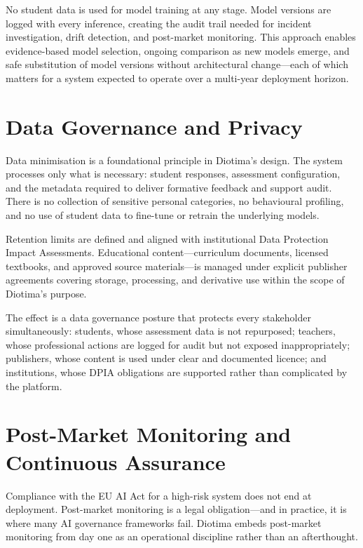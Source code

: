 \documentclass[10pt, a4paper, twocolumn]{article}
\begin{document}
No student data is used for model training at any stage. Model versions are logged
with every inference, creating the audit trail needed for incident investigation,
drift detection, and post-market monitoring. This approach enables evidence-based
model selection, ongoing comparison as new models emerge, and safe substitution of
model versions without architectural change---each of which matters for a system
expected to operate over a multi-year deployment horizon.

\section{Data Governance and Privacy}

Data minimisation is a foundational principle in Diotima's design. The system
processes only what is necessary: student responses, assessment configuration, and
the metadata required to deliver formative feedback and support audit. There is no
collection of sensitive personal categories, no behavioural profiling, and no use of
student data to fine-tune or retrain the underlying models.

Retention limits are defined and aligned with institutional Data Protection Impact
Assessments. Educational content---curriculum documents, licensed textbooks, and
approved source materials---is managed under explicit publisher agreements covering
storage, processing, and derivative use within the scope of Diotima's purpose.

The effect is a data governance posture that protects every stakeholder simultaneously:
students, whose assessment data is not repurposed; teachers, whose professional actions
are logged for audit but not exposed inappropriately; publishers, whose content is
used under clear and documented licence; and institutions, whose DPIA obligations are
supported rather than complicated by the platform.

\section{Post-Market Monitoring and Continuous Assurance}

Compliance with the EU AI Act for a high-risk system does not end at deployment.
Post-market monitoring is a legal obligation---and in practice, it is where many AI
governance frameworks fail. Diotima embeds post-market monitoring from day one as an
operational discipline rather than an afterthought.
\end{document}
